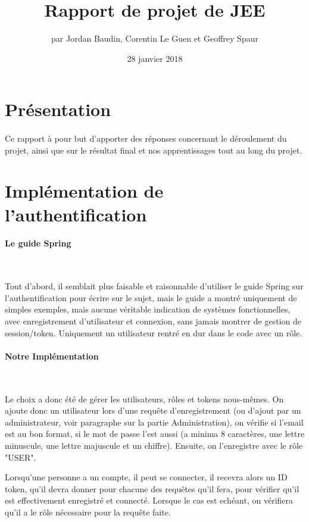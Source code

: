 \documentclass{article}
\title{Rapport de projet de JEE}
\author{par Jordan Baudin, Corentin Le Guen et Geoffrey Spaur}
\date{28 janvier 2018}
\begin{document}
\maketitle
\newpage
\tableofcontents{}
\newpage
\section{Présentation}
  \paragraph{}
  Ce rapport à pour but d'apporter des réponses concernant le déroulement du projet, 
  ainsi que sur le résultat final et nos apprentissages tout au long du projet.
  
\newpage
\section{Implémentation de l'authentification}
  \paragraph{Le guide Spring} \
  
  Tout d'abord, il semblait plus faisable et raisonnable d'utiliser le guide Spring sur l'authentification
  pour écrire sur le sujet, mais le guide a montré uniquement de simples exemples, mais aucune véritable indication
  de systèmes fonctionnelles, avec enregistrement d'utilisateur et connexion, sans jamais montrer de gestion de session/token.
  Uniquement un utilisateur rentré en dur dans le code avec un rôle.

  \paragraph{Notre Implémentation} \
  
  Le choix a donc été de gérer les utilisateurs, rôles et tokens nous-mêmes.
  On ajoute donc un utilisateur lors d'une requête d'enregistrement (ou d'ajout par un administrateur, voir paragraphe sur la partie Administration),
  on vérifie si l'email est au bon format, si le mot de passe l'est aussi (a minima 8 caractères, une lettre minuscule, une lettre majuscule et un chiffre).
  Ensuite, on l'enregistre avec le rôle "USER".

  Lorsqu'une personne a un compte, il peut se connecter, il recevra alors un ID token, qu'il devra donner pour chacune des requêtes qu'il fera,
  pour vérifier qu'il est effectivement enregistré et connecté. Lorsque le cas est echéant, on vérifiera qu'il a le rôle nécessaire pour la requête faite.
\end{document}
